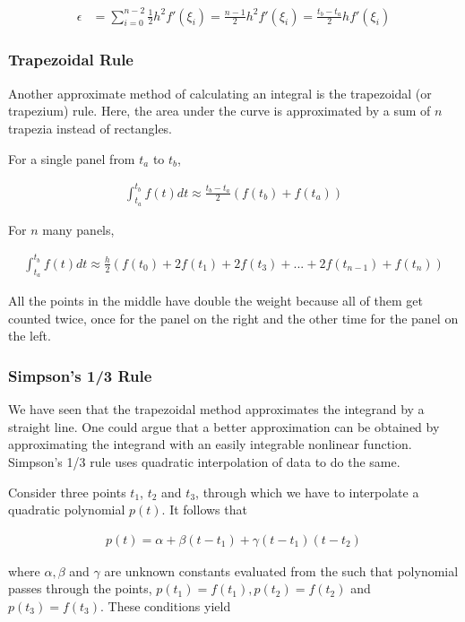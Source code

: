 \begin{align}
    \epsilon &= \sum_{i=0}^{n-2} \frac{1}{2}h^2f'(\xi_i) =  \frac{n-1}{2}h^2f'(\xi_i) = \frac{t_b-t_a}{2}hf'(\xi_i)
\end{align}

\subsubsection{Trapezoidal Rule}
Another approximate method of calculating an integral is the trapezoidal (or trapezium) rule. Here, the area under the curve is approximated by a sum of $n$ trapezia instead of rectangles. 

For a single panel from $t_a$ to $t_b$,

\begin{align}
    \int_{t_a}^{t_b} f(t) dt \approx \frac{t_b-t_a}{2}(f(t_b)+f(t_a))
\end{align}

For $n$ many panels, 

\begin{align}
    \int_{t_a}^{t_b} f(t) dt \approx \frac{h}{2}(f(t_0)+2f(t_1)+2f(t_3)+...+2f(t_{n-1})+f(t_n))
\end{align}

All the points in the middle have double the weight because all of them get counted twice, once for the panel on the right and the other time for the panel on the left.

\subsubsection{Simpson's 1/3 Rule}
We have seen that the trapezoidal method approximates the integrand by a straight line. One could argue that a better approximation can be obtained by approximating the integrand with an easily integrable nonlinear function. Simpson's 1/3 rule uses quadratic interpolation of data to do the same.

Consider three points $t_1$, $t_2$ and $t_3$, through which we have to interpolate a quadratic polynomial $p(t)$. It follows that

\begin{align}
    p(t) = \alpha + \beta(t-t_1) + \gamma(t-t_1)(t-t_2)
\end{align}

where $\alpha, \beta$ and $\gamma$ are unknown constants evaluated from the such that polynomial passes through the points, $p(t_1) = f(t_1), p(t_2) = f(t_2)$ and $p(t_3) = f(t_3)$. These conditions yield

